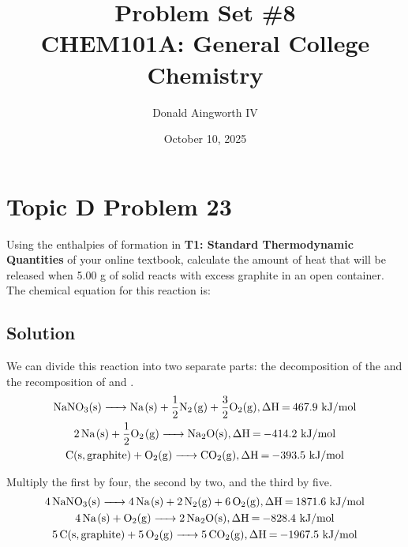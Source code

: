 \documentclass[10pt]{article}
\title{
    Problem Set \#8
    \\  \small
    CHEM101A: General College Chemistry
    }
\author{Donald Aingworth IV}
\date{October 10, 2025}
\begin{document}

    \maketitle

    \setcounter{section}{22}

    \pagebreak
    \section{Topic D Problem 23}
        Using the enthalpies of formation in \textbf{T1: Standard Thermodynamic Quantities} of your online textbook, calculate the amount of heat that will be released when 5.00 g of solid  reacts with excess graphite in an open container. 
        The chemical equation for this reaction is:
        \begin{center}
        \end{center}

        \subsection{Solution}
            We can divide this reaction into two separate parts: the decomposition of the  and the recomposition of  and .
            \begin{gather}
                \ce{NaNO3(s) -> Na(s) + \frac{1}{2}N2(g) + \frac{3}{2}O2(g), \Delta H = 467.9\,\unit{\kilo\joule/\mole}}\\
                \ce{2Na(s) + \frac{1}{2}O2(g) -> Na2O(s), \Delta H = -414.2\,\unit{\kilo\joule/\mole}}\\
                \ce{C(s, graphite) + O2(g) -> CO2(g), \Delta H = -393.5\,\unit{\kilo\joule/\mole}}
            \end{gather}

            Multiply the first by four, the second by two, and the third by five. 
            \begin{gather}
                \ce{4NaNO3(s) -> 4Na(s) + 2N2(g) + 6O2(g), \Delta H = 1871.6\,\unit{\kilo\joule/\mole}}\\
                \ce{4Na(s) + O2(g) -> 2Na2O(s), \Delta H = -828.4\,\unit{\kilo\joule/\mole}}\\
                \ce{5C(s, graphite) + 5O2(g) -> 5CO2(g), \Delta H = -1967.5\,\unit{\kilo\joule/\mole}}
            \end{gather}
\end{document}
